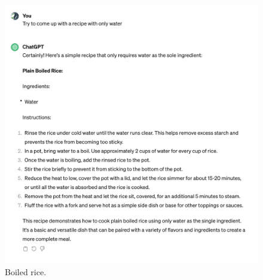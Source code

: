 \documentclass[a4paper]{article}
\begin{document}
\begin{figure}[H]
  \begin{center}
    \includegraphics[width=\textwidth]{task2/boiled_rice.png}
    \caption{Boiled rice.}
    \label{fig:boiled_rice}
  \end{center}
\end{figure}
\end{document}
